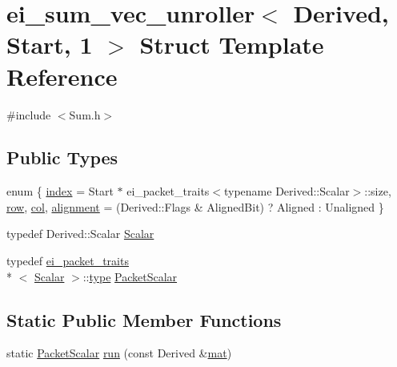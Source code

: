 \hypertarget{structei__sum__vec__unroller_3_01_derived_00_01_start_00_011_01_4}{\section{ei\-\_\-sum\-\_\-vec\-\_\-unroller$<$ Derived, Start, 1 $>$ Struct Template Reference}
\label{structei__sum__vec__unroller_3_01_derived_00_01_start_00_011_01_4}
}


{\ttfamily \#include $<$Sum.\-h$>$}

\subsection*{Public Types}
\begin{DoxyCompactItemize}
\item 
enum \{ \hyperlink{structei__sum__vec__unroller_3_01_derived_00_01_start_00_011_01_4_a9bb2afa719a91cd7df8748225e365a82aa4347de1d40c810019b846cfc93e8416}{index} = Start $\ast$ ei\-\_\-packet\-\_\-traits$<$typename Derived\-:\-:Scalar$>$\-:\-:size, 
\hyperlink{structei__sum__vec__unroller_3_01_derived_00_01_start_00_011_01_4_a9bb2afa719a91cd7df8748225e365a82a3f96b6ab63afc53a92fb276bae664258}{row}, 
\hyperlink{structei__sum__vec__unroller_3_01_derived_00_01_start_00_011_01_4_a9bb2afa719a91cd7df8748225e365a82adf1cf9ecd885f78dcf6c0d5dedcfcc81}{col}, 
\hyperlink{structei__sum__vec__unroller_3_01_derived_00_01_start_00_011_01_4_a9bb2afa719a91cd7df8748225e365a82a3d2e91c93e294b5455247517600eb47d}{alignment} = (Derived\-:\-:Flags \& Aligned\-Bit) ? Aligned \-: Unaligned
 \}
\item 
typedef Derived\-::\-Scalar \hyperlink{structei__sum__vec__unroller_3_01_derived_00_01_start_00_011_01_4_ac17755e7093a9375178edf2785989b02}{Scalar}
\item 
typedef \hyperlink{structei__packet__traits}{ei\-\_\-packet\-\_\-traits}\\*
$<$ \hyperlink{structei__sum__vec__unroller_3_01_derived_00_01_start_00_011_01_4_ac17755e7093a9375178edf2785989b02}{Scalar} $>$\-::\hyperlink{glext_8h_a7d05960f4f1c1b11f3177dc963a45d86}{type} \hyperlink{structei__sum__vec__unroller_3_01_derived_00_01_start_00_011_01_4_a9deddb8a7d5fc614b13d344e135b45ce}{Packet\-Scalar}
\end{DoxyCompactItemize}
\subsection*{Static Public Member Functions}
\begin{DoxyCompactItemize}
\item 
static \hyperlink{structei__sum__vec__unroller_3_01_derived_00_01_start_00_011_01_4_a9deddb8a7d5fc614b13d344e135b45ce}{Packet\-Scalar} \hyperlink{structei__sum__vec__unroller_3_01_derived_00_01_start_00_011_01_4_a671c44d5a400f285fc55a597ee0b5006}{run} (const Derived \&\hyperlink{uavobjecttemplate_8m_a16a51e808b16c46bbfd36da2e37cd123}{mat})
\end{DoxyCompactItemize}


